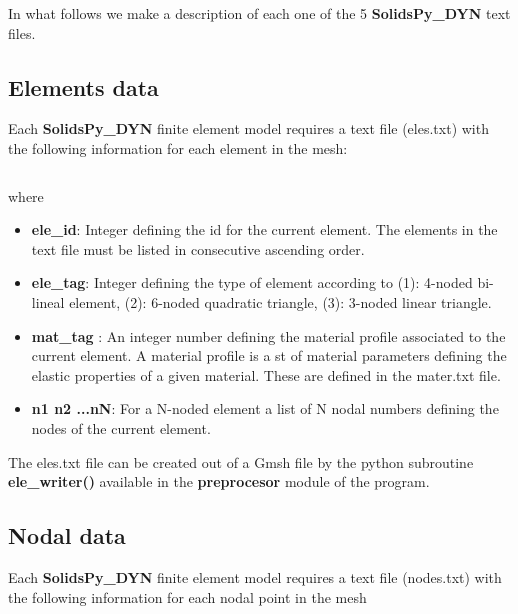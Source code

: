 \documentclass[11pt,letterpaper]{article}
\begin{document}
In what follows we make a description of each one of the 5 {\bf SolidsPy\_DYN} text files. 

\subsection{Elements data}
Each {\bf SolidsPy\_DYN} finite element model requires a text file (eles.txt) with the following information for each element in the mesh:
\inputminted[mathescape,
               numbersep=5pt,
               gobble=0,
               frame=lines,
               framesep=2mm]{c}{elesT.txt}
               
where

\begin{itemize}
\item {\bf ele\_id}: Integer defining the id for the current element. The elements in the text file must be listed in consecutive ascending order.
\item {\bf ele\_tag}: Integer defining the type of element according to (1): 4-noded bi-lineal element, (2): 6-noded quadratic triangle, (3): 3-noded linear triangle.
\item {\bf mat\_tag }: An integer number defining the material profile associated to the current element. A material profile is a st of material parameters defining the elastic properties of a given material. These are defined in the mater.txt file.
\item{\bf  n1  n2  ...nN}: For a N-noded element a list of N nodal numbers defining the nodes of the current element.
\end{itemize}

The eles.txt file can be created out of a Gmsh file by the python subroutine {\bf ele\_writer()} available in the {\bf preprocesor} module of the program.

\subsection{Nodal data}
Each {\bf SolidsPy\_DYN} finite element model requires a text file (nodes.txt) with the following information for each nodal point in the mesh

\inputminted[mathescape,
               numbersep=5pt,
               gobble=0,
               frame=lines,
               framesep=2mm]{c}{nodesT.txt}
\end{document}
